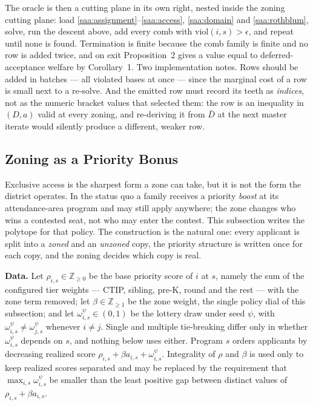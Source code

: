 \documentclass{article}
\begin{document}
The oracle is then a cutting plane in its own right, nested inside the zoning cutting plane: load \eqref{saa:assignment}--\eqref{saa:access}, \eqref{saa:domain} and \eqref{saa:rothblum}, solve, run the descent above, add every comb with $\mathrm{viol}(i,s) > \epsilon$, and repeat until none is found. Termination is finite because the comb family is finite and no row is added twice, and on exit Proposition~2 gives a value equal to deferred-acceptance welfare by Corollary~1. Two implementation notes. Rows should be added in batches --- all violated bases at once --- since the marginal cost of a row is small next to a re-solve. And the emitted row must record its teeth as \emph{indices}, not as the numeric bracket values that selected them: the row is an inequality in $(D,a)$ valid at every zoning, and re-deriving it from $\bar D$ at the next master iterate would silently produce a different, weaker row.

\subsection{Zoning as a Priority Bonus}
\label{app:ap_bonus}

Exclusive access is the sharpest form a zone can take, but it is not the form the district operates. In the status quo a family receives a priority \emph{boost} at its attendance-area program and may still apply anywhere; the zone changes who wins a contested seat, not who may enter the contest. This subsection writes the polytope for that policy. The construction is the natural one: every applicant is split into a \emph{zoned} and an \emph{unzoned} copy, the priority structure is written once for each copy, and the zoning decides which copy is real.

\noindent\textbf{Data.} Let $\rho_{i,s} \in \mathbb{Z}_{\ge 0}$ be the base priority score of $i$ at $s$, namely the sum of the configured tier weights --- CTIP, sibling, pre-K, round and the rest --- with the zone term removed; let $\beta \in \mathbb{Z}_{\ge 1}$ be the zone weight, the single policy dial of this subsection; and let $\omega_{i,s}^\psi \in (0,1)$ be the lottery draw under seed $\psi$, with $\omega_{i,s}^\psi \neq \omega_{j,s}^\psi$ whenever $i \neq j$. Single and multiple tie-breaking differ only in whether $\omega_{i,s}^\psi$ depends on $s$, and nothing below uses either. Program $s$ orders applicants by decreasing realized score $\rho_{i,s} + \beta a_{i,s} + \omega_{i,s}^\psi$. Integrality of $\rho$ and $\beta$ is used only to keep realized scores separated and may be replaced by the requirement that $\max_{i,s} \omega^\psi_{i,s}$ be smaller than the least positive gap between distinct values of $\rho_{i,s} + \beta a_{i,s}$.
\end{document}
